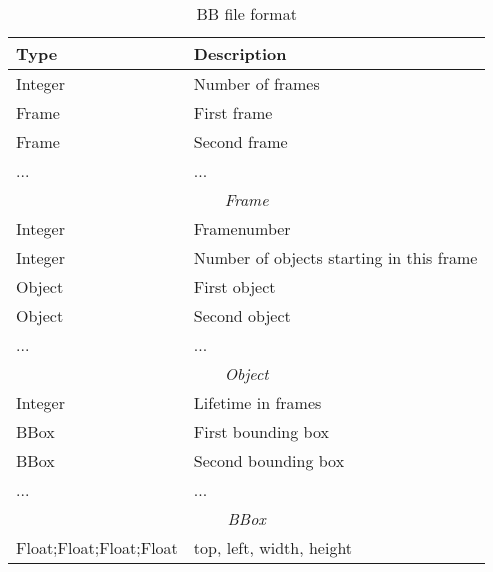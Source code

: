 %

      \begin{table}[H]
         \centering
         \caption{BB file format}
         \begin{tabular}{|l|l|}
            \hline
            \textbf{Type} & \textbf{Description} \\
            \hline\hline
            Integer & Number of frames \\
            \hline
            Frame & First frame \\
            Frame & Second frame \\
            ... & ... \\
            \hline \hline
            \multicolumn{2}{|c|}{\textit{Frame}} \\
            \hline
            Integer & Framenumber \\
            \hline
            Integer & Number of objects starting in this frame \\
            \hline
            Object & First object \\
            Object & Second object \\
            ... & ... \\
            \hline \hline
            \multicolumn{2}{|c|}{\textit{Object}} \\
            \hline
            Integer & Lifetime in frames \\
            \hline
            BBox & First bounding box \\
            BBox & Second bounding box \\
            ... & ... \\
            \hline \hline
            \multicolumn{2}{|c|}{\textit{BBox}} \\
            \hline
            Float;Float;Float;Float & top, left, width, height \\
            \hline
         \end{tabular}
         \label{tab:bbformat}
      \end{table}      
\newpage
